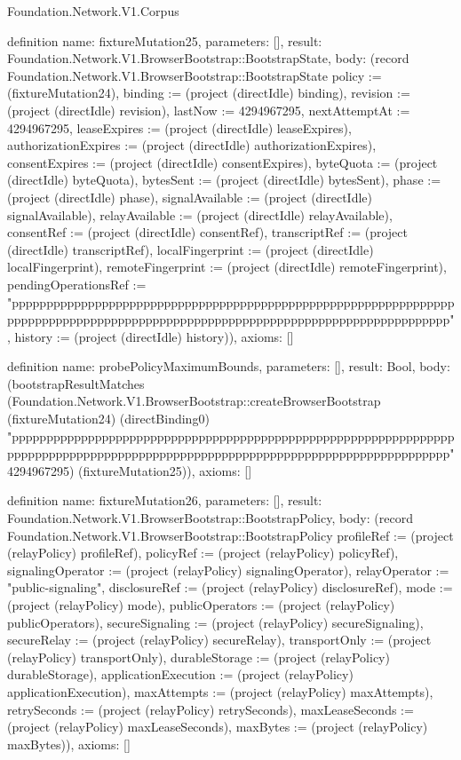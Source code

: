 \begin{lexlean}{Foundation.Network.V1.Corpus}
\begin{semanticmodule}
definition{
  name: fixtureMutation25,
  parameters: [],
  result: Foundation.Network.V1.BrowserBootstrap::BootstrapState,
  body: (record Foundation.Network.V1.BrowserBootstrap::BootstrapState {policy := (fixtureMutation24), binding := (project (directIdle) binding), revision := (project (directIdle) revision), lastNow := 4294967295, nextAttemptAt := 4294967295, leaseExpires := (project (directIdle) leaseExpires), authorizationExpires := (project (directIdle) authorizationExpires), consentExpires := (project (directIdle) consentExpires), byteQuota := (project (directIdle) byteQuota), bytesSent := (project (directIdle) bytesSent), phase := (project (directIdle) phase), signalAvailable := (project (directIdle) signalAvailable), relayAvailable := (project (directIdle) relayAvailable), consentRef := (project (directIdle) consentRef), transcriptRef := (project (directIdle) transcriptRef), localFingerprint := (project (directIdle) localFingerprint), remoteFingerprint := (project (directIdle) remoteFingerprint), pendingOperationsRef := "pppppppppppppppppppppppppppppppppppppppppppppppppppppppppppppppppppppppppppppppppppppppppppppppppppppppppppppppppppppppppppppppp", history := (project (directIdle) history)}),
  axioms: []
}

definition{
  name: probePolicyMaximumBounds,
  parameters: [],
  result: Bool,
  body: (bootstrapResultMatches (Foundation.Network.V1.BrowserBootstrap::createBrowserBootstrap (fixtureMutation24) (directBinding0) "pppppppppppppppppppppppppppppppppppppppppppppppppppppppppppppppppppppppppppppppppppppppppppppppppppppppppppppppppppppppppppppppp" 4294967295) (fixtureMutation25)),
  axioms: []
}

definition{
  name: fixtureMutation26,
  parameters: [],
  result: Foundation.Network.V1.BrowserBootstrap::BootstrapPolicy,
  body: (record Foundation.Network.V1.BrowserBootstrap::BootstrapPolicy {profileRef := (project (relayPolicy) profileRef), policyRef := (project (relayPolicy) policyRef), signalingOperator := (project (relayPolicy) signalingOperator), relayOperator := "public-signaling", disclosureRef := (project (relayPolicy) disclosureRef), mode := (project (relayPolicy) mode), publicOperators := (project (relayPolicy) publicOperators), secureSignaling := (project (relayPolicy) secureSignaling), secureRelay := (project (relayPolicy) secureRelay), transportOnly := (project (relayPolicy) transportOnly), durableStorage := (project (relayPolicy) durableStorage), applicationExecution := (project (relayPolicy) applicationExecution), maxAttempts := (project (relayPolicy) maxAttempts), retrySeconds := (project (relayPolicy) retrySeconds), maxLeaseSeconds := (project (relayPolicy) maxLeaseSeconds), maxBytes := (project (relayPolicy) maxBytes)}),
  axioms: []
}


\end{semanticmodule}
\end{lexlean}
